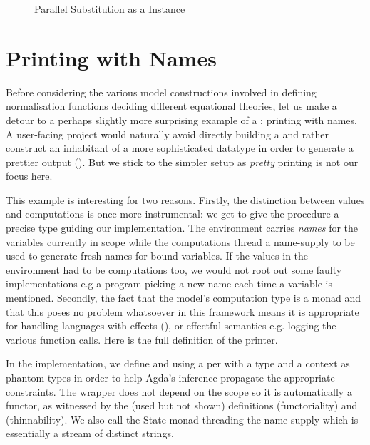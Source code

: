 \begin{figure}[h]
\begin{minipage}{0.4\textwidth}
\end{minipage}\begin{minipage}{0.6\textwidth}
\end{minipage}
\caption{Parallel Substitution as a  Instance\label{fig:synsub}}
\end{figure}

\section{Printing with Names}
\label{prettyprint}

Before considering the various model constructions involved in defining
normalisation functions deciding different equational theories, let us
make a detour to a perhaps slightly more surprising example of a
: printing with names. A user-facing project would naturally
avoid directly building a  and rather construct an inhabitant of
a more sophisticated datatype in order to generate a prettier output
(\cite{hughes1995design,wadler2003prettier,Bernardy:2017:PBG:3136534.3110250}).
But we stick to the simpler setup as \emph{pretty} printing is not our
focus here.

This example is interesting for two reasons. Firstly, the distinction between
values and computations is once more instrumental: we get to give the procedure
a precise type guiding our implementation. The environment carries \emph{names}
for the variables currently in scope while the computations thread a name-supply
to be used to generate fresh names for bound variables. If the values in the
environment had to be computations too, we would not root out some faulty
implementations e.g a program picking a new name each time a variable is mentioned.
%
Secondly, the fact that the model's computation type is a monad and that this
poses no problem whatsoever in this framework means it is appropriate for
handling languages with effects (\cite{moggi1991notions}), or effectful
semantics e.g. logging the various function calls. Here is the full definition
of the printer.

In the implementation, we define  and  using a per
with a type and a context as phantom types in order to help Agda's inference
propagate the appropriate constraints. The wrapper  does not depend on
the scope  so it is automatically a  functor, as witnessed by
the (used but not shown) definitions 
(functoriality) and  (thinnability).
%
We also call  the State monad threading the name supply which is
essentially a stream of distinct strings.


